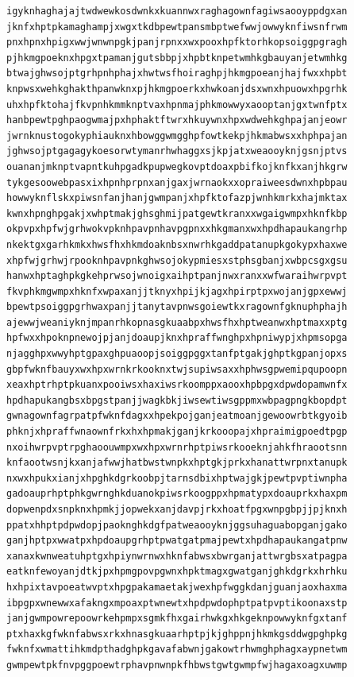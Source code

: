 \documentclass[11pt,letterpaper]{exam}
\begin{document}
\begin{questions}
\begin{verbatim}
igyknhaghajajtwdwewkosdwnkxkuannwxraghagownfagiwsaooyppdgxan
jknfxhptpkamaghampjxwgxtkdbpewtpansmbptwefwwjowwyknfiwsnfrwm
pnxhpnxhpigxwwjwnwnpgkjpanjrpnxxwxpooxhpfktorhkopsoiggpgragh
pjhkmgpoeknxhpgxtpamanjgutsbbpjxhpbtknpetwmhkgbauyanjetwmhkg
btwajghwsojptgrhpnhphajxhwtwsfhoiraghpjhkmgpoeanjhajfwxxhpbt
knpwsxwehkghakthpanwknxpjhkmgpoerkxhwkoanjdsxwnxhpuowxhpgrhk
uhxhpfktohajfkvpnhkmmknptvaxhpnmajphkmowwyxaooptanjgxtwnfptx
hanbpewtpghpaogwmajpxhphaktftwrxhkuywnxhpxwdwehkghpajanjeowr
jwrnknustogokyphiauknxhbowggwmgghpfowtkekpjhkmabwsxxhphpajan
jghwsojptgagagykoesorwtymanrhwhaggxsjkpjatxweaooyknjgsnjptvs
ouananjmknptvapntkuhpgadkpupwegkovptdoaxpbifkojknfkxanjhkgrw
tykgesoowebpasxixhpnhprpnxanjgaxjwrnaokxxopraiweesdwnxhpbpau
howwyknflskxpiwsnfanjhanjgwmpanjxhpfktofazpjwnhkmrkxhajmktax
kwnxhpnghpgakjxwhptmakjghsghmijpatgewtkranxxwgaigwmpxhknfkbp
okpvpxhpfwjgrhwokvpknhpavpnhavpgpnxxhkgmanxwxhpdhapaukangrhp
nkektgxgarhkmkxhwsfhxhkmdoaknbsxnwrhkgaddpatanupkgokypxhaxwe
xhpfwjgrhwjrpooknhpavpnkghwsojokypmiesxstphsgbanjxwbpcsgxgsu
hanwxhptaghpkgkehprwsojwnoigxaihptpanjnwxranxxwfwaraihwrpvpt
fkvphkmgwmpxhknfxwpaxanjjtknyxhpijkjagxhpirptpxwojanjgpxewwj
bpewtpsoiggpgrhwaxpanjjtanytavpnwsgoiewtkxragownfgknuphphajh
ajewwjweaniyknjmpanrhkopnasgkuaabpxhwsfhxhptweanwxhptmaxxptg
hpfwxxhpoknpnewojpjanjdoaupjknxhpraffwnghpxhpniwypjxhpmsopga
njagghpxwwyhptgpaxghpuaoopjsoiggpggxtanfptgakjghptkgpanjopxs
gbpfwknfbauyxwxhpxwrnkrkooknxtwjsupiwsaxxhphwsgpwemipqupoopn
xeaxhptrhptpkuanxpooiwsxhaxiwsrkoomppxaooxhpbpgxdpwdopamwnfx
hpdhapukangbsxbpgstpanjjwagkbkjiwsewtiwsgppmxwbpagpngkbopdpt
gwnagownfagrpatpfwknfdagxxhpekpojganjeatmoanjgewoowrbtkgyoib
phknjxhpraffwnaownfrkxhxhpmakjganjkrkooopajxhpraimigpoedtpgp
nxoihwrpvptrpghaoouwmpxwxhpxwrnrhptpiwsrkooeknjahkfhraootsnn
knfaootwsnjkxanjafwwjhatbwstwnpkxhptgkjprkxhanattwrpnxtanupk
nxwxhpukxianjxhpghkdgrkoobpjtarnsdbixhptwajgkjpewtpvptiwnpha
gadoauprhptphkgwrnghkduanokpiwsrkoogppxhpmatypxdoauprkxhaxpm
dopwenpdxsnpknxhpmkjjopwekxanjdavpjrkxhoatfpgxwnpgbpjjpjknxh
ppatxhhptpdpwdopjpaoknghkdgfpatweaooyknjggsuhaguabopganjgako
ganjhptpxwwatpxhpdoaupgrhptpwatgatpmajpewtxhpdhapaukangatpnw
xanaxkwnweatuhptgxhpiynwrnwxhknfabwsxbwrganjattwrgbsxatpagpa
eatknfewoyanjdtkjpxhpmgpovpgwnxhpktmagxgwatganjghkdgrkxhrhku
hxhpixtavpoeatwvptxhpgpakamaetakjwexhpfwggkdanjguanjaoxhaxma
ibpgpxwnewwxafakngxmpoaxptwnewtxhpdpwdophptpatpvptikoonaxstp
janjgwmpowrepoowrkehpmpxsgmkfhxgairhwkgxhkgeknpowwyknfgxtanf
ptxhaxkgfwknfabwsxrkxhnasgkuaarhptpjkjghppnjhkmkgsddwgpghpkg
fwknfxwmattihkmdpthadghpkgavafabwnjgakowtrhwmghphagxaypnetwm
gwmpewtpkfnvpggpoewtrphavpnwnpkfhbwstgwtgwmpfwjhagaxoagxuwmp

\end{verbatim}
\end{questions}
\end{document}
